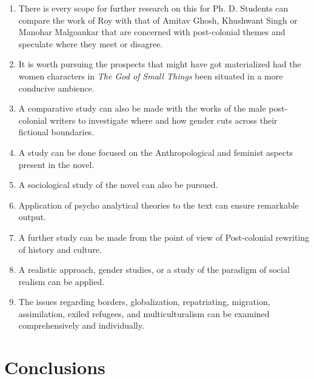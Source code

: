 \begin{enumerate}
  \item There is every scope for further research on this for Ph. D. Students can compare the work of Roy with that of Amitav Ghosh, Khushwant Singh or Manohar Malgoankar that are concerned with post-colonial themes and speculate where they meet or disagree.

  \item It is worth pursuing the prospects that might have got materialized had the women characters in \emph{The God of Small Things} been situated in a more conducive ambience.

  \item A comparative study can also be made with the works of the male post-colonial writers to investigate where and how gender cuts across their fictional boundaries. 

  \item A study can be done focused on the Anthropological and feminist aspects present in the novel.

  \item A sociological study of the novel can also be pursued.

  \item Application of psycho analytical theories to the text can ensure remarkable output.

  \item A further study can be made from the point of view of Post-colonial rewriting of history and culture.

  \item A realistic approach, gender studies, or a study of the paradigm of social realism can be applied.

  \item The issues regarding borders, globalization, repatriating, migration, assimilation, exiled refugees, and multiculturalism can be examined comprehensively and individually.
\end{enumerate}

\section{Conclusions}

